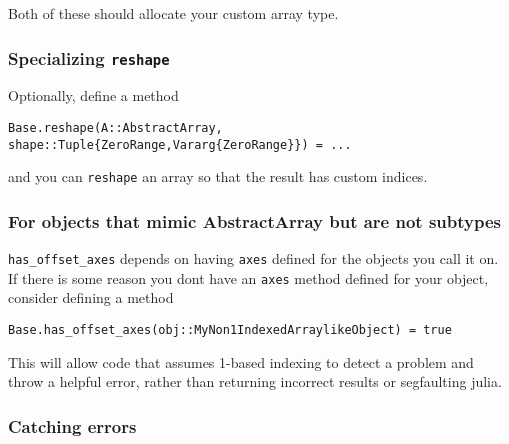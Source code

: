 Both of these should allocate your custom array type.



\hypertarget{16440701718956142132}{}


\subsubsection{Specializing \texttt{reshape}}



Optionally, define a method




\begin{lstlisting}
Base.reshape(A::AbstractArray, shape::Tuple{ZeroRange,Vararg{ZeroRange}}) = ...
\end{lstlisting}



and you can \texttt{reshape} an array so that the result has custom indices.



\hypertarget{18101383726856776769}{}


\subsubsection{For objects that mimic AbstractArray but are not subtypes}



\texttt{has\_offset\_axes} depends on having \texttt{axes} defined for the objects you call it on. If there is some reason you don{\textquotesingle}t have an \texttt{axes} method defined for your object, consider defining a method




\begin{verbatim}
Base.has_offset_axes(obj::MyNon1IndexedArraylikeObject) = true
\end{verbatim}



This will allow code that assumes 1-based indexing to detect a problem and throw a helpful error, rather than returning incorrect results or segfaulting julia.



\hypertarget{12667413576127681892}{}


\subsubsection{Catching errors}



